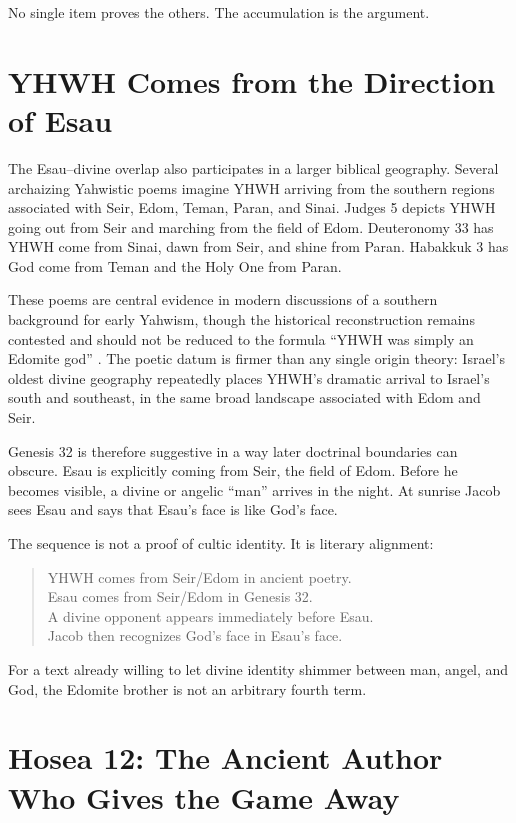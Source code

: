 No single item proves the others. The accumulation is the argument.

\section{YHWH Comes from the Direction of Esau}

The Esau--divine overlap also participates in a larger biblical geography. Several archaizing Yahwistic poems imagine YHWH arriving from the southern regions associated with Seir, Edom, Teman, Paran, and Sinai. Judges 5 depicts YHWH going out from Seir and marching from the field of Edom. Deuteronomy 33 has YHWH come from Sinai, dawn from Seir, and shine from Paran. Habakkuk 3 has God come from Teman and the Holy One from Paran.

These poems are central evidence in modern discussions of a southern background for early Yahwism, though the historical reconstruction remains contested and should not be reduced to the formula ``YHWH was simply an Edomite god'' \parencite{Fleming2021}. The poetic datum is firmer than any single origin theory: Israel's oldest divine geography repeatedly places YHWH's dramatic arrival to Israel's south and southeast, in the same broad landscape associated with Edom and Seir.

Genesis 32 is therefore suggestive in a way later doctrinal boundaries can obscure. Esau is explicitly coming from Seir, the field of Edom. Before he becomes visible, a divine or angelic ``man'' arrives in the night. At sunrise Jacob sees Esau and says that Esau's face is like God's face.

The sequence is not a proof of cultic identity. It is literary alignment:

\begin{quote}\small
YHWH comes from Seir/Edom in ancient poetry.\\
Esau comes from Seir/Edom in Genesis 32.\\
A divine opponent appears immediately before Esau.\\
Jacob then recognizes God's face in Esau's face.
\end{quote}

For a text already willing to let divine identity shimmer between man, angel, and God, the Edomite brother is not an arbitrary fourth term.

\section{Hosea 12: The Ancient Author Who Gives the Game Away}

